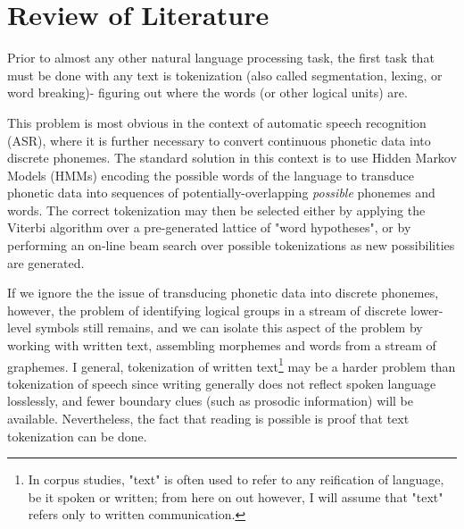 \chapter{Review of Literature}

Prior to almost any other natural language processing task, the first task that must be done with any text is tokenization (also called segmentation, lexing, or word breaking)- figuring out where the words (or other logical units) are. 

This problem is most obvious in the context of automatic speech recognition (ASR), where it is further necessary to convert continuous phonetic data into discrete phonemes. The standard solution in this context is to use Hidden Markov Models (HMMs) encoding the possible words of the language to transduce phonetic data into sequences of potentially-overlapping \textit{possible} phonemes and words\cite{varile97}. The correct tokenization may then be selected either by applying the Viterbi algorithm over a pre-generated lattice of "word hypotheses"\cite{aubert94}, or by performing an on-line beam search over possible tokenizations as new possibilities are generated\cite{paul94}.

If we ignore the the issue of transducing phonetic data into discrete phonemes, however, the problem of identifying logical groups in a stream of discrete lower-level symbols still remains, and we can isolate this aspect of the problem by working with written text, assembling morphemes and words from a stream of graphemes. I general, tokenization of written text\footnote{In corpus studies, "text" is often used to refer to any reification of language, be it spoken or written; from here on out however, I will assume that "text" refers only to written communication.} may be a harder problem than tokenization of speech since writing generally does not reflect spoken language losslessly, and fewer boundary clues (such as prosodic information) will be available. Nevertheless, the fact that reading is possible is proof that text tokenization can be done.

